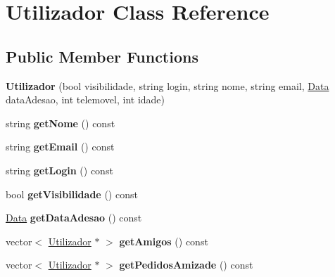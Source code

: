 \hypertarget{class_utilizador}{}\section{Utilizador Class Reference}
\label{class_utilizador}
\subsection*{Public Member Functions}
\begin{DoxyCompactItemize}
\item 
\hypertarget{class_utilizador_a470435e7e91ef2aa93eaf97b0615499b}{}{\bfseries Utilizador} (bool visibilidade, string login, string nome, string email, \hyperlink{class_data}{Data} data\+Adesao, int telemovel, int idade)\label{class_utilizador_a470435e7e91ef2aa93eaf97b0615499b}

\item 
\hypertarget{class_utilizador_aa5af9c1385b0a93116dd8a80264b887a}{}string {\bfseries get\+Nome} () const \label{class_utilizador_aa5af9c1385b0a93116dd8a80264b887a}

\item 
\hypertarget{class_utilizador_a9fc99ac7634ff085ca0f3afd4d502cc7}{}string {\bfseries get\+Email} () const \label{class_utilizador_a9fc99ac7634ff085ca0f3afd4d502cc7}

\item 
\hypertarget{class_utilizador_ad6c565c391bd19de3462e50a4e05c9a6}{}string {\bfseries get\+Login} () const \label{class_utilizador_ad6c565c391bd19de3462e50a4e05c9a6}

\item 
\hypertarget{class_utilizador_a99cdee165a8446fb67f3e0cab0831e80}{}bool {\bfseries get\+Visibilidade} () const \label{class_utilizador_a99cdee165a8446fb67f3e0cab0831e80}

\item 
\hypertarget{class_utilizador_af6c41442d2029ccb1a135092a5c27007}{}\hyperlink{class_data}{Data} {\bfseries get\+Data\+Adesao} () const \label{class_utilizador_af6c41442d2029ccb1a135092a5c27007}

\item 
\hypertarget{class_utilizador_ad76009d2278707a5c9a1e8088633cfd2}{}vector$<$ \hyperlink{class_utilizador}{Utilizador} $\ast$ $>$ {\bfseries get\+Amigos} () const \label{class_utilizador_ad76009d2278707a5c9a1e8088633cfd2}

\item 
\hypertarget{class_utilizador_a40be2d403a71f151d9204ef1a7741b5e}{}vector$<$ \hyperlink{class_utilizador}{Utilizador} $\ast$ $>$ {\bfseries get\+Pedidos\+Amizade} () const \label{class_utilizador_a40be2d403a71f151d9204ef1a7741b5e}


\end{DoxyCompactItemize}
